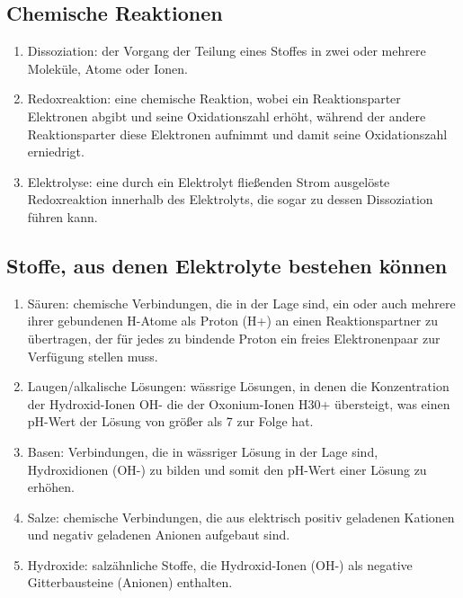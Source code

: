 \subsection{Chemische Reaktionen}
\begin{enumerate}
    \item   Dissoziation: der Vorgang der Teilung eines Stoffes in zwei oder mehrere Moleküle, Atome oder Ionen.
    \item   Redoxreaktion: eine chemische Reaktion, wobei ein Reaktionsparter Elektronen abgibt und seine Oxidationszahl erhöht, während der andere Reaktionsparter diese Elektronen aufnimmt und damit seine Oxidationszahl erniedrigt.
    \item   Elektrolyse: eine durch ein Elektrolyt fließenden Strom ausgelöste Redoxreaktion innerhalb des Elektrolyts, die sogar zu dessen Dissoziation führen kann.
\end{enumerate}

\subsection{Stoffe, aus denen Elektrolyte bestehen können}
\begin{enumerate}
    \item   Säuren: chemische Verbindungen, die in der Lage sind, ein oder auch mehrere ihrer gebundenen H-Atome als Proton (H+) an einen Reaktionspartner zu übertragen, der für jedes zu bindende Proton ein freies Elektronenpaar zur Verfügung stellen muss.
    \item   Laugen/alkalische Lösungen: wässrige Lösungen, in denen die Konzentration der Hydroxid-Ionen OH- die der Oxonium-Ionen H30+ übersteigt, was einen pH-Wert der Lösung von größer als 7 zur Folge hat.
    \item   Basen: Verbindungen, die in wässriger Lösung in der Lage sind, Hydroxidionen (OH-) zu bilden und somit den pH-Wert einer Lösung zu erhöhen.
    \item   Salze: chemische Verbindungen, die aus elektrisch positiv geladenen Kationen und negativ geladenen Anionen aufgebaut sind.
    \item   Hydroxide:  salzähnliche Stoffe, die Hydroxid-Ionen (OH-) als negative Gitterbausteine (Anionen) enthalten.
\end{enumerate}